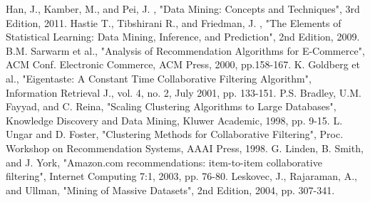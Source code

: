 \documentclass{sig-alternate-05-2015}
\begin{document}
\begin{thebibliography}{9}
 Han, J., Kamber, M., and Pei, J. , "Data Mining: Concepts and Techniques", 3rd Edition, 2011.
 Hastie T., Tibshirani R., and Friedman, J. , "The Elements of Statistical Learning: Data Mining, Inference, and Prediction", 2nd Edition, 2009.
 B.M. Sarwarm et al., "Analysis of Recommendation Algorithms for E-Commerce", ACM Conf. Electronic Commerce, ACM Press, 2000, pp.158-167.
 K. Goldberg et al., "Eigentaste: A Constant Time Collaborative Filtering Algorithm", Information Retrieval J., vol. 4, no. 2, July 2001, pp. 133-151.
 P.S. Bradley, U.M. Fayyad, and C. Reina, "Scaling Clustering Algorithms to Large Databases", Knowledge Discovery and Data Mining, Kluwer Academic, 1998, pp. 9-15.
 L. Ungar and D. Foster, "Clustering Methods for Collaborative Filtering", Proc. Workshop on Recommendation Systems, AAAI Press, 1998.
 G. Linden, B. Smith, and J. York, "Amazon.com recommendations: item-to-item collaborative filtering", Internet Computing 7:1, 2003, pp. 76-80.
 Leskovec, J., Rajaraman, A., and Ullman, "Mining of Massive Datasets", 2nd Edition, 2004, pp. 307-341.

\end{thebibliography}
\end{document}
